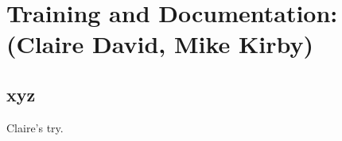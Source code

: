 \chapter{Training and Documentation: (Claire David, Mike Kirby)}
\label{ch:train}

\section{xyz}
\label{sec:train:xyz}  %

Claire's try.